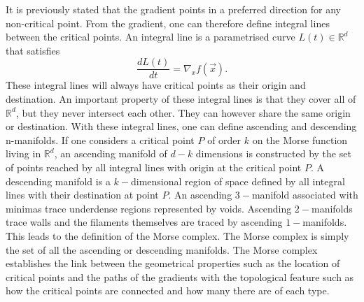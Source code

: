 It is previously stated that the gradient points in a preferred direction for any non-critical
point. From the gradient, one can therefore define integral lines between the critical
points. An integral line is a parametrised curve $L(t)\in\mathbb{R}^d$ that satisfies
\begin{equation}
    \frac{dL(t)}{dt}=\nabla_xf(\vec{x}).
\end{equation}
These integral lines will always have critical points as their origin and
destination. An important property of these integral lines is that they cover
all of $\mathbb{R}^d$, but they never intersect each other. They can however
share the same origin or destination. With these integral lines, one can define
ascending and descending n-manifolds. If one considers a critical point $P$ of
order $k$ on the Morse function living in $\mathbb{R}^d$, an ascending manifold of
$d-k$ dimensions is constructed by the set of points reached by
all integral lines with origin at the critical point $P$. A descending
manifold is a $k-$dimensional region of space defined by all integral lines with their
destination at point $P$. An ascending $3-$manifold associated with minimas trace underdense regions represented by voids. Ascending $2-$manifolds trace walls and the filaments themselves are traced by ascending $1-$manifolds. This leads to the definition of the Morse complex.
The Morse complex is simply the set of all the ascending or descending
manifolds. The Morse complex establishes the link between the geometrical properties such as the location of critical points and the paths of the gradients with the topological feature such as how the critical points are connected and how many there are of each type.\\
